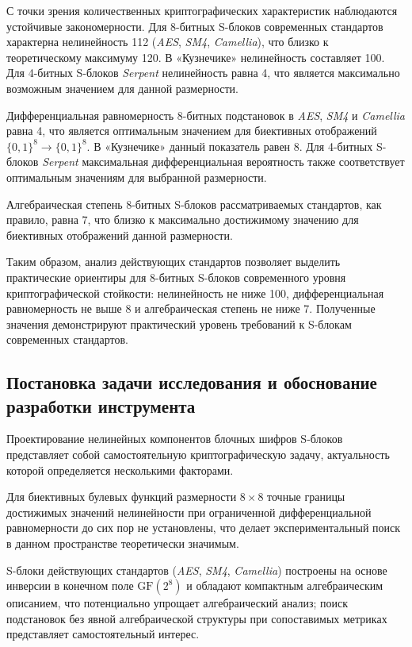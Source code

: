 С точки зрения количественных криптографических характеристик
наблюдаются устойчивые закономерности. Для 8-битных S-блоков
современных стандартов характерна нелинейность 112
(\textit{AES}, \textit{SM4}, \textit{Camellia}), что близко к
теоретическому максимуму 120. В «Кузнечике» нелинейность составляет 100.
Для 4-битных S-блоков \textit{Serpent} нелинейность равна 4,
что является максимально возможным значением для данной размерности.

Дифференциальная равномерность 8-битных подстановок в \textit{AES},
\textit{SM4} и \textit{Camellia} равна 4, что является оптимальным
значением для биективных отображений $\{0,1\}^8 \to \{0,1\}^8$.
В «Кузнечике» данный показатель равен 8. Для 4-битных S-блоков
\textit{Serpent} максимальная дифференциальная вероятность также
соответствует оптимальным значениям для выбранной размерности.

Алгебраическая степень 8-битных S-блоков рассматриваемых стандартов,
как правило, равна 7, что близко к максимально достижимому значению
для биективных отображений данной размерности.

Таким образом, анализ действующих стандартов позволяет выделить
практические ориентиры для 8-битных S-блоков современного уровня
криптографической стойкости: нелинейность не ниже 100,
дифференциальная равномерность не выше 8 и алгебраическая степень
не ниже 7. Полученные значения демонстрируют практический уровень
требований к S-блокам современных стандартов.

\subsection{Постановка задачи исследования и обоснование разработки инструмента}
Проектирование нелинейных компонентов блочных шифров S-блоков
представляет собой самостоятельную криптографическую задачу, актуальность
которой определяется несколькими факторами. 

Для биективных булевых функций размерности $8 \times 8$ точные границы достижимых
значений нелинейности при ограниченной дифференциальной равномерности
до сих пор не установлены, что делает экспериментальный поиск в данном
пространстве теоретически значимым. 

S-блоки действующих стандартов (\textit{AES}, \textit{SM4}, \textit{Camellia}) построены на основе инверсии в конечном
поле $\mathrm{GF}(2^8)$ и обладают компактным алгебраическим описанием,
что потенциально упрощает алгебраический анализ; поиск подстановок без
явной алгебраической структуры при сопоставимых метриках представляет
самостоятельный интерес.


